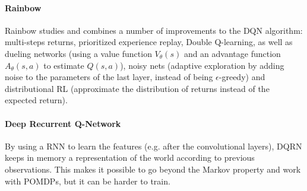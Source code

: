 \paragraph{Rainbow \cite{hessel2018rainbow}}
Rainbow studies and combines a number of improvements to the DQN algorithm: multi-steps returns, prioritized experience replay, Double Q-learning, as well as dueling networks (using a value function $V_\theta(s)$ and an advantage function $A_\theta(s,a)$ to estimate $Q(s,a)$), noisy nets (adaptive exploration by adding noise to the parameters of the last layer, instead of being $\epsilon$-greedy) and distributional RL (approximate the distribution of returns instead of the expected return).

\paragraph{Deep Recurrent Q-Network \cite{hausknecht2015deep}}
By using a RNN to learn the features (e.g. after the convolutional layers), DQRN keeps in memory a representation of the world according to previous observations. This makes it possible to go beyond the Markov property and work with POMDPs, but it can be harder to train.

